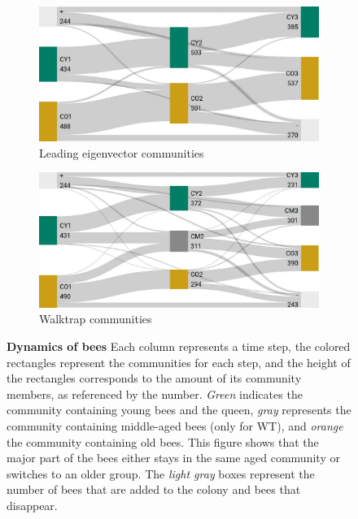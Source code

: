 \begin{figure}[htbp]
	\centering
	\begin{subfigure}[b]{1\textwidth}
	\centering
	\includegraphics[width=1\textwidth]{Figures/LE_matching.pdf}
	\caption[Leading eigenvector communities]{Leading eigenvector communities}
	\label{fig:membersLE}
	\vspace*{10mm}
	\end{subfigure}
	\begin{subfigure}[b]{1\textwidth}
	\centering
	\includegraphics[width=1\textwidth]{Figures/WT_matching.pdf}
	\caption[Walktrap communities]{Walktrap communities}
	\label{fig:membersWT}
	\vspace*{5mm}
	\end{subfigure}
	\caption[Dynamics of bees]{\textbf{Dynamics of bees} 
	Each column represents a time step, the colored rectangles represent the communities for each step, and the height of the rectangles corresponds to the amount of its community members, as referenced by the number. \emph{Green} indicates the community containing young bees and the queen, \emph{gray} represents the community containing middle-aged bees (only for WT), and \emph{orange} the community containing old bees. This figure shows that the major part of the bees either stays in the same aged community or switches to an older group. The \emph{light gray} boxes represent the number of bees that are added to the colony and bees that disappear.}
	\label{fig:members}
\end{figure}
